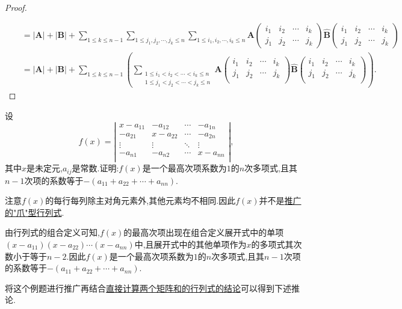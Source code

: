 \documentclass[../../main.tex]{subfiles}
\begin{document}
\begin{proof}
\begin{align*}
{{\begin{array}{c}
\end{array}}}
\\
&= |\boldsymbol{A}| + |\boldsymbol{B}| + \sum_{1\leqslant k\leqslant n - 1}\sum_{1\leqslant j_1,j_2,\cdots,j_k\leqslant n}\sum_{1\leqslant i_1,i_2,\cdots,i_k\leqslant n}\boldsymbol{A}\left(\begin{matrix}
i_1 & i_2 & \cdots & i_k\\
j_1 & j_2 & \cdots & j_k
\end{matrix}\right)\widehat{\boldsymbol{B}}\left(\begin{matrix}
i_1 & i_2 & \cdots & i_k\\
j_1 & j_2 & \cdots & j_k
\end{matrix}\right)
\\
&=|\boldsymbol{A}|+|\boldsymbol{B}|+\sum_{1\le k\le n-1}{\left( \sum_{\substack{1\le i_1<i_2<\cdots <i_k\le n\\1\le j_1<j_2<\cdots <j_k\le n}}{\boldsymbol{A}\left( \begin{matrix}
i_1&		i_2&		\cdots&		i_k\\
j_1&		j_2&		\cdots&		j_k\\
\end{matrix} \right) \widehat{\boldsymbol{B}}\left( \begin{matrix}
i_1&		i_2&		\cdots&		i_k\\
j_1&		j_2&		\cdots&		j_k\\
\end{matrix} \right)} \right)}.
\end{align*}
\end{proof}

\begin{example}\label{example:特征行列式写成多项式形式的系数}
设
\[
f(x)=\left| \begin{matrix}
x-a_{11}&		-a_{12}&		\cdots&		-a_{1n}\\
-a_{21}&		x-a_{22}&		\cdots&		-a_{2n}\\
\vdots&		\vdots&		\ddots&		\vdots\\
-a_{n1}&		-a_{n2}&		\cdots&		x-a_{nn}\\
\end{matrix} \right|,
\]
其中\(x\)是未定元,\(a_{ij}\)是常数.证明:\(f(x)\)是一个最高次项系数为\(1\)的\(n\)次多项式,且其\(n - 1\)次项的系数等于\(-(a_{11}+a_{22}+\cdots + a_{nn})\).
\end{example}
\begin{note}
注意$f(x)$的每行每列除主对角元素外,其他元素均不相同.因此$f(x)$并不是\hyperref["爪"型行列式的推广]{推广的"爪"型行列式}.
\end{note}
\begin{solution}
由行列式的组合定义可知,\(f(x)\)的最高次项出现在组合定义展开式中的单项\((x - a_{11})(x - a_{22})\cdots(x - a_{nn})\)中,且展开式中的其他单项作为\(x\)的多项式其次数小于等于\(n - 2\).因此\(f(x)\)是一个最高次项系数为\(1\)的\(n\)次多项式,且其\(n - 1\)次项的系数等于\(-(a_{11}+a_{22}+\cdots + a_{nn})\).
\end{solution}
\begin{remark}
将这个例题进行推广再结合\hyperref[proposition:直接计算两个矩阵和的行列式]{直接计算两个矩阵和的行列式的结论}可以得到下述推论.
\end{remark}
\end{document}
